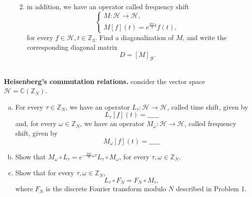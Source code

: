 \documentclass{article}
\def\zz{{\mathbb Z}}
\def\cc{{\mathbb C}}
\begin{document}
\begin{problem}
\begin{enumerate}[(a)]
\begin{enumerate}[1.]
\begin{equation*}
            \end{equation*}
            \item in addition, we have an operator called frequency shift
            \begin{equation*}
                \begin{cases}
                    M : \mathscr{H} \to \mathscr{H}, \\
                    M[f](t) = e^{\frac{2 \pi i}{3} t} f(t),
                \end{cases}
            \end{equation*}
            for every $f \in \mathscr{H}, t \in \zz_3$. Find a diagonalization of $M$, and write the corresponding diagonal matrix
            \begin{equation*}
                D = [M]_{\mathscr{B}}.
            \end{equation*}
        \end{enumerate}
    \end{enumerate}
\end{problem}




\begin{problem} \\ 
    \textbf{Heisenberg's commutation relations.} consider the vector space $\mathscr{H} = \cc(\zz_N)$.
    \begin{enumerate}[(a)]
        \item For every $\tau \in \zz_N$, we have an operator $L_\tau : \mathscr{H} \to \mathscr{H}$, called time shift, given by
        \begin{equation*}
            L_\tau[f](t) = \_\_\_\_\_
        \end{equation*}
        and, for every $\omega \in \zz_N$, we have an operator $M_\omega : \mathscr{H} \to \mathscr{H}$, called frequency shift, given by
        \begin{equation*}
            M_\omega[f](t) = \_\_\_\_\_
        \end{equation*}
        \item Show that $M_\omega \circ L_\tau = e^{-\frac{2 \pi i}{N} \omega \tau} L_\tau \circ M_\omega$, for every $\tau, \omega \in \zz_N$.
        \item Show that for every $\tau, \omega \in \zz_N$, 
        \begin{equation*}
            L_\tau \circ F_N = F_N \circ M_\tau,
        \end{equation*}
        where $F_N$ is the discrete Fourier transform modulo $N$ described in Problem 1.
    \end{enumerate}
\end{problem}
\end{document}
